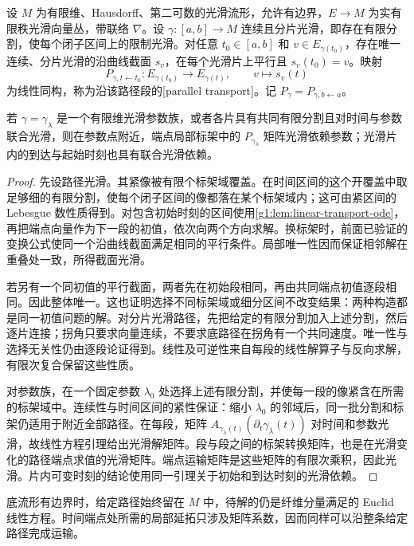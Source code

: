 \begin{theorem}\label{g1:thm:parallel-transport}
	设 \(M\) 为有限维、Hausdorff、第二可数的光滑流形，允许有边界，\(E\to M\) 为实有限秩光滑向量丛，带联络 \(\nabla\)。设 \(\gamma:[a,b]\to M\) 连续且分片光滑，即存在有限分割，使每个闭子区间上的限制光滑。对任意 \(t_0\in[a,b]\) 和 \(v\in E_{\gamma(t_0)}\)，存在唯一连续、分片光滑的沿曲线截面 \(s_v\)，在每个光滑片上平行且 \(s_v(t_0)=v\)。映射
	\[
		P_{\gamma,t\leftarrow t_0}:E_{\gamma(t_0)}\longrightarrow E_{\gamma(t)},\qquad
		v\longmapsto s_v(t)
	\]
	为线性同构，称为沿该路径段的[parallel transport]。记 \(P_\gamma=P_{\gamma,b\leftarrow a}\)。

	若 \(\gamma=\gamma_\lambda\) 是一个有限维光滑参数族，或者各片具有共同有限分割且对时间与参数联合光滑，则在参数点附近，端点局部标架中的 \(P_{\gamma_\lambda}\) 矩阵光滑依赖参数；光滑片内的到达与起始时刻也具有联合光滑依赖。
\end{theorem}
\begin{proof}
	先设路径光滑。其紧像被有限个标架域覆盖。在时间区间的这个开覆盖中取足够细的有限分割，使每个闭子区间的像都落在某个标架域内；这可由紧区间的 Lebesgue 数性质得到。对包含初始时刻的区间使用\cref{g1:lem:linear-transport-ode}，再把端点向量作为下一段的初值，依次向两个方向求解。换标架时，前面已验证的变换公式使同一个沿曲线截面满足相同的平行条件。局部唯一性因而保证相邻解在重叠处一致，所得截面光滑。

	若另有一个同初值的平行截面，两者先在初始段相同，再由共同端点初值逐段相同。因此整体唯一。这也证明选择不同标架域或细分区间不改变结果：两种构造都是同一初值问题的解。对分片光滑路径，先把给定的有限分割加入上述分割，然后逐片连接；拐角只要求向量连续，不要求底路径在拐角有一个共同速度。唯一性与选择无关性仍由逐段论证得到。线性及可逆性来自每段的线性解算子与反向求解，有限次复合保留这些性质。

	对参数族，在一个固定参数 \(\lambda_0\) 处选择上述有限分割，并使每一段的像紧含在所需的标架域中。连续性与时间区间的紧性保证：缩小 \(\lambda_0\) 的邻域后，同一批分割和标架仍适用于附近全部路径。在每段，矩阵 \(A_{\gamma_\lambda(t)}(\partial_t\gamma_\lambda(t))\) 对时间和参数光滑，故线性方程引理给出光滑解矩阵。段与段之间的标架转换矩阵，也是在光滑变化的路径端点求值的光滑矩阵。端点运输矩阵是这些矩阵的有限次乘积，因此光滑。片内可变时刻的结论使用同一引理关于初始和到达时刻的光滑依赖。
\end{proof}

底流形有边界时，给定路径始终留在 \(M\) 中，待解的仍是纤维分量满足的 Euclid 线性方程。时间端点处所需的局部延拓只涉及矩阵系数，因而同样可以沿整条给定路径完成运输。

